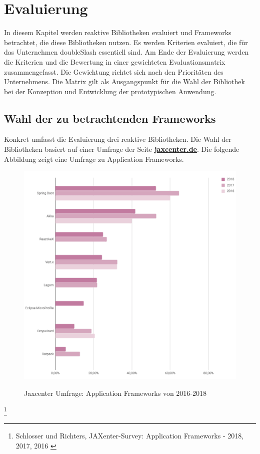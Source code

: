 \chapter{Evaluierung}
\label{chap:evaluierung}
In diesem Kapitel werden reaktive Bibliotheken evaluiert und Frameworks betrachtet, die diese Bibliotheken nutzen. Es werden Kriterien evaluiert, die für das Unternehmen doubleSlash essentiell sind. Am Ende der Evaluierung werden die Kriterien und die Bewertung in einer gewichteten Evaluationsmatrix zusammengefasst. Die Gewichtung richtet sich nach den Prioritäten des Unternehmens. Die Matrix gilt als Ausgangspunkt für die Wahl der Bibliothek bei der Konzeption und Entwicklung der prototypischen Anwendung. 

\section{Wahl der zu betrachtenden Frameworks}
Konkret umfasst die Evaluierung drei reaktive Bibliotheken. Die Wahl der Bibliotheken basiert auf einer Umfrage der Seite \href{https://www.jaxcenter.de}{\textbf{jaxcenter.de}}. Die folgende Abbildung zeigt eine Umfrage zu Application Frameworks.

\begin{center}
\begin{figure}[H]
	\centering
	\caption{Jaxcenter Umfrage: Application Frameworks von 2016-2018}
  	\includegraphics[width=.75\textwidth]{media/technologietrends.png}
	\label{jaxcenter:survey}
\end{figure}
\footnote{Schlosser und Richters, JAXenter-Survey: Application Frameworks - 2018, 2017, 2016 \cite{web:site:jaxcenter:trends}}
\end{center}

